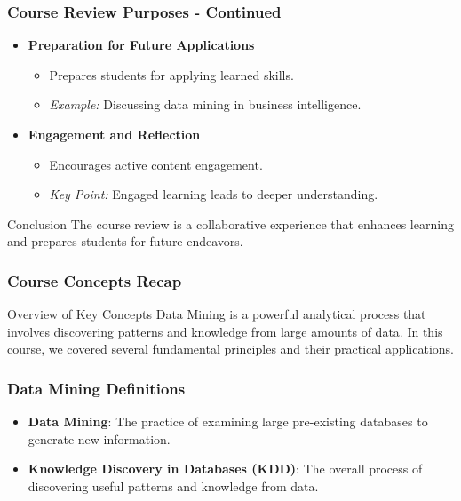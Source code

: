 \documentclass{beamer}
\begin{document}
\begin{frame}[fragile]
    \frametitle{Course Review Purposes - Continued}
    \begin{itemize}
        \item \textbf{Preparation for Future Applications}
            \begin{itemize}
                \item Prepares students for applying learned skills.
                \item \textit{Example:} Discussing data mining in business intelligence.
            \end{itemize}
        
        \item \textbf{Engagement and Reflection}
            \begin{itemize}
                \item Encourages active content engagement.
                \item \textit{Key Point:} Engaged learning leads to deeper understanding.
            \end{itemize}
    \end{itemize}

    \begin{block}{Conclusion}
        The course review is a collaborative experience that enhances learning and prepares students for future endeavors.
    \end{block}
\end{frame}

\begin{frame}[fragile]
    \frametitle{Course Concepts Recap}
    \begin{block}{Overview of Key Concepts}
        Data Mining is a powerful analytical process that involves discovering patterns and knowledge from large amounts of data. In this course, we covered several fundamental principles and their practical applications.
    \end{block}
\end{frame}

\begin{frame}[fragile]
    \frametitle{Data Mining Definitions}
    \begin{itemize}
        \item \textbf{Data Mining}: The practice of examining large pre-existing databases to generate new information.
        \item \textbf{Knowledge Discovery in Databases (KDD)}: The overall process of discovering useful patterns and knowledge from data.
    \end{itemize}
\end{frame}
\end{document}
